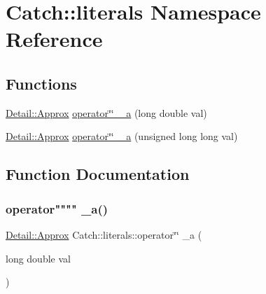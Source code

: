 \hypertarget{namespace_catch_1_1literals}{}\section{Catch\+:\+:literals Namespace Reference}
\label{namespace_catch_1_1literals}
\subsection*{Functions}
\begin{DoxyCompactItemize}
\item 
\mbox{\hyperlink{class_catch_1_1_detail_1_1_approx}{Detail\+::\+Approx}} \mbox{\hyperlink{namespace_catch_1_1literals_a26820e7099689458de4f845e74b68a91}{operator\char`\"{}\char`\"{} \+\_\+a}} (long double val)
\item 
\mbox{\hyperlink{class_catch_1_1_detail_1_1_approx}{Detail\+::\+Approx}} \mbox{\hyperlink{namespace_catch_1_1literals_abc3b748bc9921d4bf4728f5e88722407}{operator\char`\"{}\char`\"{} \+\_\+a}} (unsigned long long val)
\end{DoxyCompactItemize}


\subsection{Function Documentation}
\mbox{\label{namespace_catch_1_1literals_a26820e7099689458de4f845e74b68a91}} 
\subsubsection{\texorpdfstring{operator"""" \+\_\+a()}{operator"" \_a()}\hspace{0.1cm}{\footnotesize\ttfamily [1/2]}}
{\footnotesize\ttfamily \mbox{\hyperlink{class_catch_1_1_detail_1_1_approx}{Detail\+::\+Approx}} Catch\+::literals\+::operator\char`\"{}\char`\"{} \+\_\+a (\begin{DoxyParamCaption}\item[{long double}]{val }\end{DoxyParamCaption})}

\mbox{\label{namespace_catch_1_1literals_abc3b748bc9921d4bf4728f5e88722407}} 

